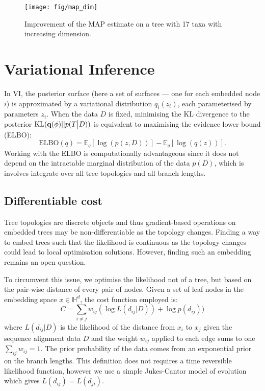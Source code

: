 \documentclass[11pt, twocolumn]{article}
\newcommand{\be}{\begin{equation*}}
\newcommand{\ee}{\end{equation*}}
\begin{document}
\begin{figure}[htbp] \label{fig:map_dim}
\begin{center}
    \texttt{[image: fig/map\_dim]}
\end{center}
\caption{Improvement of the MAP estimate on a tree with 17 taxa with increasing dimension.}
\end{figure}

\section{Variational Inference}
In VI, the posterior surface (here a set of surfaces --- one for each embedded node $i$) is approximated by a variational distribution $q_{i}(z_{i})$, each parameterised by parameters $z_{i}$.
When the data $D$ is fixed, minimising the KL divergence to the posterior $\text{KL}({\bf q}(\phi)||p(T\big|D))$ is equivalent to maximising the evidence lower bound (ELBO):
\be
\text{ELBO}(q) = \mathbb{E}_{q}[\log(p(z,D))] - \mathbb{E}_{q}[\log(q(z))].
\ee
Working with the ELBO is computationally advantageous since it does not depend on the intractable marginal distribution of the data $p(D)$, which is involves integrate over all tree topologies and all branch lengths.

\subsection{Differentiable cost}
Tree topologies are discrete objects and thus gradient-based operations on embedded trees may be non-differentiable as the topology changes.
Finding a way to embed trees such that the likelihood is continuous as the topology changes could lead to local optimisation solutions.
However, finding such an embedding remains an open question.

To circumvent this issue, we optimise the likelihood not of a tree, but based on the pair-wise distance of every pair of nodes.
Given a set of leaf nodes in the embedding space $x \in \mathbb{H}^{d}$, the cost function employed is:
\begin{equation}
C = \sum_{i \neq j} w_{ij} (\log L(d_{ij}|D)) + \log p(d_{ij}))
\end{equation}
\noindent where $L(d_{ij}|D)$ is the likelihood of the distance from $x_{i}$ to $x_{j}$ given the sequence alignment data $D$ and the weight $w_{ij}$ applied to each edge sums to one $\sum_{ij} w_{ij} = 1$.
The prior probability of the data comes from an exponential prior on the branch lengths.
This definition does not requires a time reversible likelihood function, however we use a simple Jukes-Cantor model of evolution which gives $L(d_{ij})=L(d_{ji})$.
\end{document}
